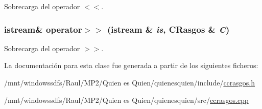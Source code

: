 Sobrecarga del operador $<$$<$. 

\hypertarget{class_c_rasgos_b75cef1ff62ead35759d2993921b695d}{
\subsubsection[{operator$>$$>$}]{\setlength{\rightskip}{0pt plus 5cm}istream\& operator$>$$>$ (istream \& {\em is}, \/  {\bf CRasgos} \& {\em C})}}
\label{class_c_rasgos_b75cef1ff62ead35759d2993921b695d}


Sobrecarga del operador $>$$>$. 



La documentación para esta clase fue generada a partir de los siguientes ficheros:\begin{CompactItemize}
\item 
/mnt/windowssdfs/Raul/MP2/Quien es Quien/quienesquien/include/\hyperlink{ccrasgos_8h}{ccrasgos.h}\item 
/mnt/windowssdfs/Raul/MP2/Quien es Quien/quienesquien/src/\hyperlink{ccrasgos_8cpp}{ccrasgos.cpp}\end{CompactItemize}
